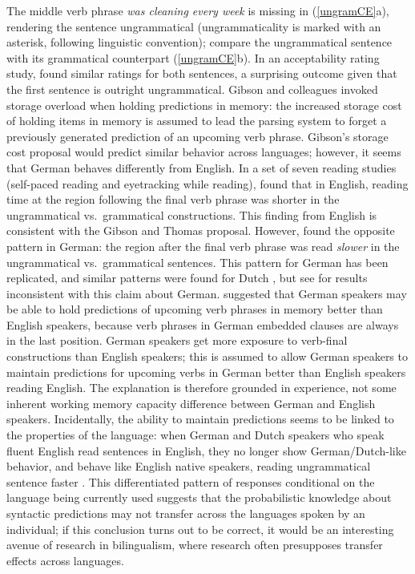 \documentclass{cambridge7A}\usepackage[]{graphicx}\usepackage[]{color}
\begin{document}
The middle verb phrase \textit{was cleaning every week} is missing in
(\ref{ungramCE}a), rendering the sentence ungrammatical
(ungrammaticality is marked with an asterisk, following linguistic
convention); compare the ungrammatical sentence with its grammatical
counterpart (\ref{ungramCE}b).  In an acceptability rating study,
\cite{gibsonthomas97} found similar ratings for both sentences, a
surprising outcome given that the first sentence is outright
ungrammatical. Gibson and colleagues invoked storage overload when
holding predictions in memory: the increased storage cost of holding items 
in memory is assumed to lead the parsing system to forget a previously generated prediction of an upcoming verb phrase. 
Gibson's storage cost proposal would predict similar behavior
across languages; however, it seems that German behaves differently
from English. In a set of seven reading studies (self-paced reading
and eyetracking while reading), \cite{VasishthSuckowLewis2010} found
that in English, reading time at the region following the final verb
phrase was shorter in the ungrammatical vs.\ grammatical
constructions. This finding from English is consistent with the Gibson and Thomas
proposal. However, \cite{VasishthSuckowLewis2010} found the opposite
pattern in German: the region after the final verb phrase was read
\textit{slower} in the ungrammatical vs.\ grammatical sentences. This
pattern for German has been replicated, and similar patterns were
found for Dutch \citep{FrankTrompenaarsVasishth2015}, but see
\cite{bader2016complex} for results inconsistent with this claim about
German. \cite{VasishthSuckowLewis2010} suggested that German speakers
may be able to hold predictions of upcoming verb phrases in memory
better than English speakers, because verb phrases in German embedded  
clauses are always in the last position. German speakers get more exposure to verb-final constructions than English speakers; this is assumed to allow German speakers to maintain predictions for upcoming verbs in German better than English speakers reading English. The explanation is therefore grounded in experience, not some inherent working memory capacity difference between German and English speakers. Incidentally, the ability to maintain predictions seems to be linked to the properties of the language: when German and Dutch speakers who speak fluent English read sentences in English, they no longer show German/Dutch-like behavior, and behave like English native speakers, reading ungrammatical sentence faster 
\citep{FrankTrompenaarsVasishth2015}. This differentiated pattern of responses conditional on the language being currently used suggests that the  probabilistic knowledge about syntactic predictions may not transfer across the languages spoken by an individual; if this conclusion turns out to be correct, it would be an interesting avenue of research in bilingualism, where research often presupposes  transfer effects across languages. 
\end{document}
